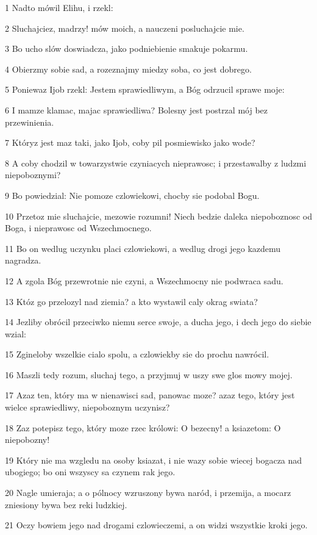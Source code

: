 \par 1 Nadto mówil Elihu, i rzekl:
\par 2 Sluchajciez, madrzy! mów moich, a nauczeni posluchajcie mie.
\par 3 Bo ucho slów doswiadcza, jako podniebienie smakuje pokarmu.
\par 4 Obierzmy sobie sad, a rozeznajmy miedzy soba, co jest dobrego.
\par 5 Poniewaz Ijob rzekl: Jestem sprawiedliwym, a Bóg odrzucil sprawe moje:
\par 6 I mamze klamac, majac sprawiedliwa? Bolesny jest postrzal mój bez przewinienia.
\par 7 Któryz jest maz taki, jako Ijob, coby pil posmiewisko jako wode?
\par 8 A coby chodzil w towarzystwie czyniacych nieprawosc; i przestawalby z ludzmi niepoboznymi?
\par 9 Bo powiedzial: Nie pomoze czlowiekowi, chocby sie podobal Bogu.
\par 10 Przetoz mie sluchajcie, mezowie rozumni! Niech bedzie daleka niepoboznosc od Boga, i nieprawosc od Wszechmocnego.
\par 11 Bo on wedlug uczynku placi czlowiekowi, a wedlug drogi jego kazdemu nagradza.
\par 12 A zgola Bóg przewrotnie nie czyni, a Wszechmocny nie podwraca sadu.
\par 13 Któz go przelozyl nad ziemia? a kto wystawil caly okrag swiata?
\par 14 Jezliby obrócil przeciwko niemu serce swoje, a ducha jego, i dech jego do siebie wzial:
\par 15 Zgineloby wszelkie cialo spolu, a czlowiekby sie do prochu nawrócil.
\par 16 Maszli tedy rozum, sluchaj tego, a przyjmuj w uszy swe glos mowy mojej.
\par 17 Azaz ten, który ma w nienawisci sad, panowac moze? azaz tego, który jest wielce sprawiedliwy, niepoboznym uczynisz?
\par 18 Zaz potepisz tego, który moze rzec królowi: O bezecny! a ksiazetom: O niepobozny!
\par 19 Który nie ma wzgledu na osoby ksiazat, i nie wazy sobie wiecej bogacza nad ubogiego; bo oni wszyscy sa czynem rak jego.
\par 20 Nagle umieraja; a o pólnocy wzruszony bywa naród, i przemija, a mocarz zniesiony bywa bez reki ludzkiej.
\par 21 Oczy bowiem jego nad drogami czlowieczemi, a on widzi wszystkie kroki jego.
